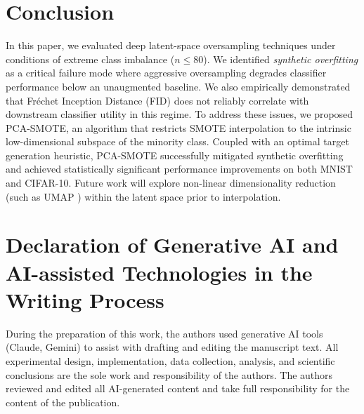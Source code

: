 \documentclass[5p,times]{elsarticle}
\begin{document}
\section{Conclusion}
\label{sec:conclusion}
In this paper, we evaluated deep latent-space oversampling techniques under conditions of extreme class imbalance ($n \le 80$). We identified \emph{synthetic overfitting} as a critical failure mode where aggressive oversampling degrades classifier performance below an unaugmented baseline. We also empirically demonstrated that Fr\'{e}chet Inception Distance (FID) does not reliably correlate with downstream classifier utility in this regime. To address these issues, we proposed PCA-SMOTE, an algorithm that restricts SMOTE interpolation to the intrinsic low-dimensional subspace of the minority class. Coupled with an optimal target generation heuristic, PCA-SMOTE successfully mitigated synthetic overfitting and achieved statistically significant performance improvements on both MNIST and CIFAR-10. Future work will explore non-linear dimensionality reduction (such as UMAP \citep{mcinnes2018umap}) within the latent space prior to interpolation.

\section*{Declaration of Generative AI and AI-assisted Technologies in the Writing Process}
During the preparation of this work, the authors used generative AI tools (Claude, Gemini) to assist with drafting and editing the manuscript text. All experimental design, implementation, data collection, analysis, and scientific conclusions are the sole work and responsibility of the authors. The authors reviewed and edited all AI-generated content and take full responsibility for the content of the publication.




\end{document}
